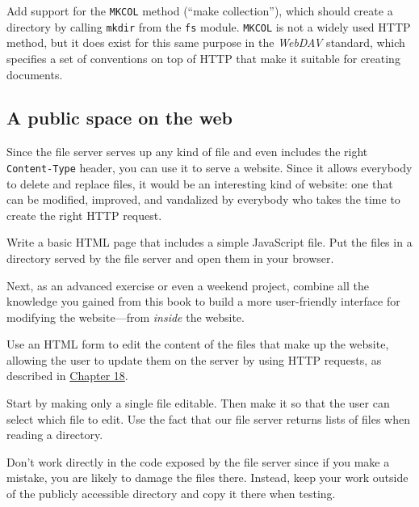 Add support for the \lstinline`MKCOL` method (``make collection''), which should create a directory by calling \lstinline`mkdir` from the \lstinline`fs` module. \lstinline`MKCOL` is not a widely used HTTP method, but it does exist for this same purpose in the \emph{WebDAV} standard, which specifies a set of conventions on top of HTTP that make it suitable for creating documents.

\subsection{A public space on the web}

Since the file server serves up any kind of file and even includes the right \lstinline`Content-Type` header, you can use it to serve a website. Since it allows everybody to delete and replace files, it would be an interesting kind of website: one that can be modified, improved, and vandalized by everybody who takes the time to create the right HTTP request.

Write a basic HTML page that includes a simple JavaScript file. Put the files in a directory served by the file server and open them in your browser.

Next, as an advanced exercise or even a weekend project, combine all the knowledge you gained from this book to build a more user-friendly interface for modifying the website—from \emph{inside} the website.

Use an HTML form to edit the content of the files that make up the website, allowing the user to update them on the server by using HTTP requests, as described in \hyperref[http]{Chapter 18}.

Start by making only a single file editable. Then make it so that the user can select which file to edit. Use the fact that our file server returns lists of files when reading a directory.

Don't work directly in the code exposed by the file server since if you make a mistake, you are likely to damage the files there. Instead, keep your work outside of the publicly accessible directory and copy it there when testing.
